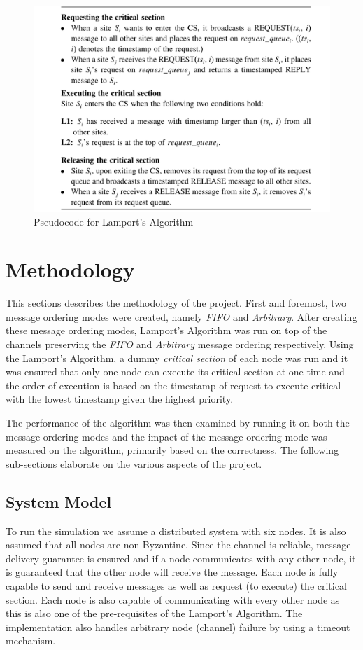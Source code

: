 \documentclass[a4paper, 12pt]{article}
\begin{document}
				\begin{figure}[H]
					\label{Lamportalgo}
					\includegraphics[width=\linewidth]{lamport_algo.png}
					\caption{Pseudocode for Lamport's Algorithm \cite{4}}
				\end{figure}
			
				
	\section{Methodology}
			This sections describes the methodology of the project. First and foremost, two message ordering modes were created, namely \textit{FIFO} and \textit{Arbitrary}. After creating these message ordering modes, Lamport's Algorithm was run on top of the channels preserving the \textit{FIFO} and \textit{Arbitrary} message ordering respectively. Using the Lamport's Algorithm, a dummy \textit{critical section} of each node was run and it was ensured that only one node can execute its critical section at one time and the order of execution is based on the timestamp of request to execute critical with the lowest timestamp given the highest priority.
			\par The performance of the algorithm was then examined by running it on both the message ordering modes and the impact of the message ordering mode was measured on the algorithm, primarily based on the correctness. The following sub-sections elaborate on the various aspects of the project.
			
			
		\subsection{System Model}
			To run the simulation we assume a distributed system with six nodes. It is also assumed that all nodes are non-Byzantine. Since the channel is reliable, message delivery guarantee is ensured and if a node communicates with any other node, it is guaranteed that the other node will receive the message. Each node is fully capable to send and receive messages as well as request (to execute) the critical section. Each node is also capable of communicating with every other node as this is also one of the pre-requisites of the Lamport's Algorithm. The implementation also handles arbitrary node (channel) failure by using a timeout mechanism.
			
\end{document}
